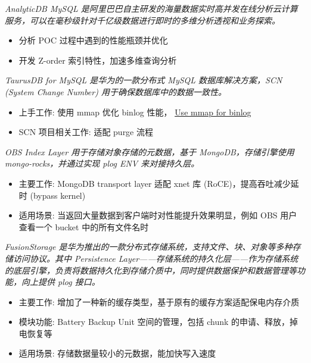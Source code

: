 \documentclass{resume}
\begin{document}
\textit{AnalyticDB MySQL 是阿里巴巴自主研发的海量数据实时高并发在线分析云计算服务，可以在毫秒级针对千亿级数据进行即时的多维分析透视和业务探索。}
\begin{onehalfspacing}
\begin{itemize}
  \item 分析 POC 过程中遇到的性能瓶颈并优化
  \item 开发 Z-order 索引特性，加速多维查询分析
\end{itemize}
\end{onehalfspacing}

\textit{TaurusDB for MySQL 是华为的一款分布式 MySQL 数据库解决方案，SCN (System Change Number) 用于确保数据库中的数据一致性。}
\begin{onehalfspacing}
\begin{itemize}
  \item 上手工作: 使用 mmap 优化 binlog 性能， \href{https://github.com/mysql/mysql-server/pull/314}{Use mmap for binlog}
  \item SCN 项目相关工作: 适配 purge 流程
\end{itemize}
\end{onehalfspacing}

\textit{OBS Index Layer 用于存储对象存储的元数据，基于 MongoDB，存储引擎使用 mongo-rocks，并通过实现 plog ENV 来对接持久层。}
\begin{onehalfspacing}
\begin{itemize}
  \item 主要工作: MongoDB transport layer 适配 xnet 库 (RoCE)，提高吞吐减少延时 (bypass kernel)
  \item 适用场景: 当返回大量数据到客户端时对性能提升效果明显，例如 OBS 用户查看一个 bucket 中的所有文件名时
\end{itemize}
\end{onehalfspacing}

\textit{FusionStorage 是华为推出的一款分布式存储系统，支持文件、块、对象等多种存储访问协议。其中 Persistence Layer——存储系统的持久化层——作为存储系统的底层引擎，负责将数据持久化到存储介质中，同时提供数据保护和数据管理等功能，向上提供 plog 接口。}
\begin{onehalfspacing}
\begin{itemize}
  \item 主要工作: 增加了一种新的缓存类型，基于原有的缓存方案适配保电内存介质
  \item 模块功能: Battery Backup Unit 空间的管理，包括 chunk 的申请、释放，掉电恢复等
  \item 适用场景: 存储数据量较小的元数据，能加快写入速度
\end{itemize}
\end{onehalfspacing}
\end{document}
